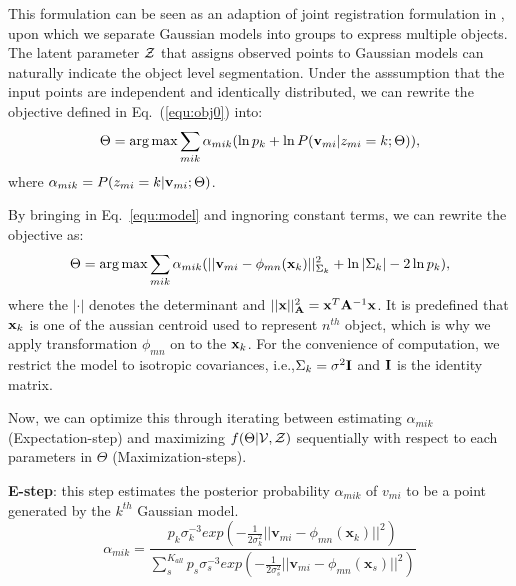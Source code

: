 This formulation can be seen as an adaption of  joint registration formulation in \cite{Evangelidis2014}, upon which we separate Gaussian models into groups to express multiple objects. 
%
The latent parameter $\mathcal{Z}$ that assigns observed points to Gaussian models can naturally indicate the object level segmentation.
%
Under the asssumption  that the input points are independent and identically distributed, we can rewrite the objective defined in Eq.~(\ref{equ:obj0}) into:
%
\begin{equation} \label{equ:obj2}
\Theta=\arg\max\sum_{mik}\alpha_{mik}(\ln p_k + \ln P(\mathbf{v}_{mi}|z_{mi}=k;\Theta)),
\end{equation}
%
where $\alpha_{mik} = P( z_{mi} = k | \mathbf{v}_{mi} ; \Theta )$.


By bringing in Eq.~\ref{equ:model} and ingnoring  constant terms, we can rewrite the objective as:
\begin{equation}
\label{equ:obj3}
\Theta=\arg\max\sum_{mik}\alpha_{mik}(||\mathbf{v}_{mi}-\phi_{mn}(\mathbf{x}_k)||_{\Sigma_k}^2 + \ln |\Sigma_k| - 2\ln p_k), 
\end{equation}
%
where the $|\cdot|$ denotes the determinant and $||\mathbf{x}||_{\mathbf{A}}^2=\mathbf{x}^T\mathbf{A}^{-1}\mathbf{x}$. 
%
It is predefined that $\mathbf{x}_k$ is one of the aussian centroid used to represent $n^{th}$ object, which is why we apply transformation $\phi_{mn}$ on to the $\mathbf{x}_k$. 
%
For the convenience of computation, we restrict the model to isotropic covariances, i.e.,$\Sigma_k=\sigma^2\mathbf{I}$ and $\mathbf{I}$ is the identity matrix.



Now, we can optimize this through iterating between estimating $\alpha_{mik}$ (Expectation-step) and maximizing $f(\Theta|\mathcal{V},\mathcal{Z})$ sequentially with respect to each parameters in $\Theta$ (Maximization-steps).
%

\textbf{E-step}:
this step estimates the posterior probability $\alpha_{mik}$ of $v_{mi}$ to be a point generated by the $k^{th}$ Gaussian model.
%
\begin{equation}
\label{equ:estep}
\alpha_{mik}=\frac{p_k\sigma_k^{-3}exp(-\frac{1}{2\sigma_k^2}||\pmb v_{mi}-\phi_{mn}(\pmb x_k)||^2)}{\sum_s^{K_{all}}p_s\sigma_s^{-3}exp(-\frac{1}{2\sigma_s^2}||\pmb v_{mi}-\phi_{mn}(\pmb x_s)||^2)}
\end{equation}
%


